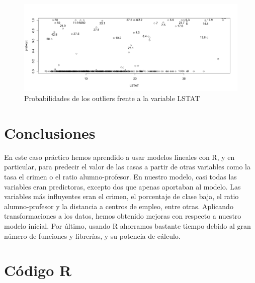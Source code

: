 \documentclass[12pt,a4paper,twoside,openright,titlepage,final]{article}
\begin{document}
\begin{figure}[tbph!]
\centering
\includegraphics[width=0.9\linewidth]{imagenes/outliers}
\caption{Probabilidades de los outliers frente a la variable LSTAT}
\label{fig:outliers}
\end{figure}

\section{Conclusiones}

En este caso práctico hemos aprendido a usar modelos lineales con R, y en particular, para predecir el valor de las casas a partir de otras variables como la tasa el crimen o el ratio alumno-profesor. En nuestro modelo, casi todas las variables eran predictoras, excepto dos que apenas aportaban al modelo. Las variables más influyentes eran el crimen, el porcentaje de clase baja, el ratio alumno-profesor y la distancia a centros de empleo, entre otras. Aplicando transformaciones a los datos, hemos obtenido mejoras con respecto a nuestro modelo inicial. Por último, usando R ahorramos bastante tiempo debido al gran número de funciones y librerías,  y su potencia de cálculo.

\newpage

\section{Código R}


\end{document}
